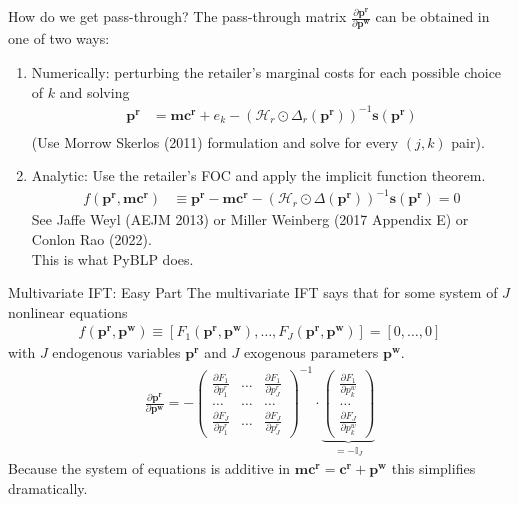 \begin{frame}{How do we get pass-through?}
The \alert{pass-through matrix} $\frac{\partial \mathbf{p^r}}{\partial \mathbf{p^w}}$ can be obtained in one of two ways:
\begin{enumerate}
\item Numerically: perturbing the retailer's marginal costs for each possible choice of $k$ and solving
\begin{align*}
\mathbf{p^r} &=\mathbf{mc^r} + e_k -(\mathcal{H}_r \odot \Delta_{r}(\mathbf{p^r}))^{-1} \mathbf{s}(\mathbf{p^r})\\
\end{align*}
(Use Morrow Skerlos (2011) formulation and solve for every $(j,k)$ pair).
\item Analytic: Use the retailer's FOC and apply the implicit function theorem.
\begin{align}
\tag{retailer FOC}
 f(\mathbf{p^r},\mathbf{mc^r}) &\equiv \mathbf{p^r}  - \mathbf{mc^r}-  \left(\mathcal{H}_{r} \odot \Delta(\mathbf{p^r}) \right)^{-1} \mathbf{s}(\mathbf{p^r})=0 
\end{align}
See Jaffe Weyl (AEJM 2013) or Miller Weinberg (2017 Appendix E) or Conlon Rao (2022).\\
\alert{This is what PyBLP does}.
  \end{enumerate}

\end{frame}

\begin{frame}{Multivariate IFT: Easy Part}
The multivariate IFT says that for some system of $J$ nonlinear equations 
\begin{align*}
f(\mathbf{p^r},\mathbf{p^w}) \equiv [F_1(\mathbf{p^r},\mathbf{p^w}), \ldots, F_J(\mathbf{p^r},\mathbf{p^w})]=[0,\ldots,0]
\end{align*}
with $J$ endogenous variables $\mathbf{p^r}$ and $J$ exogenous parameters $\mathbf{p^w}$.
\begin{align}
\label{eq:ptr_matrix}
\tag{PTR}
\frac{\partial \mathbf{p^r}}{\partial \mathbf{p^w}}
=-\left(\begin{array}{ccc}
\frac{\partial F_{1}}{\partial p_{1}^r} & \ldots & \frac{\partial F_{1}}{\partial p_{J}^r} \\
\ldots & \ldots & \ldots \\
\frac{\partial F_{J}}{\partial p_{1}^r} & \ldots & \frac{\partial F_{J}}{\partial p_{J}^r}
\end{array}\right)^{-1} \cdot \underbrace{\left(\begin{array}{l}
\frac{\partial F_{1}}{\partial p_{k}^w} \\
\ldots \\
\frac{\partial F_{J}}{\partial p_{k}^w}
\end{array}\right)}_{= -\mathbb{I}_J}
\end{align}
Because the system of equations is additive in $\mathbf{mc^r} = \mathbf{c^r} + \mathbf{p^w}$ this simplifies dramatically.
\end{frame}


